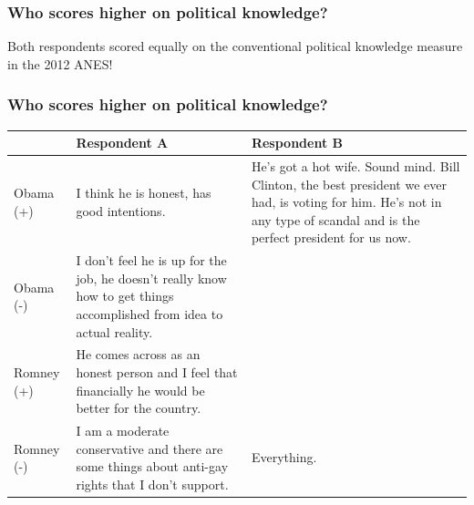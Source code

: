 \documentclass{beamer}
\begin{document}
\begin{frame}%
\frametitle{Who scores higher on political knowledge?}
\begin{center}
\large{Both respondents scored equally on the conventional political knowledge measure in the 2012 ANES!}
\end{center}
\end{frame}


\begin{frame}%
\frametitle{Who scores higher on political knowledge?}
\begin{table}[ht]\footnotesize\centering
\begin{tabular}{l|p{4.5cm}|p{4.5cm}}
   \toprule
    & \textbf{Respondent A} & \textbf{Respondent B} \\ 
    \midrule
  Obama (+) & I think he is honest, has good intentions. & He's got a hot wife. Sound mind. Bill Clinton, the best president we ever had, is voting for him. He's not in any type of scandal and is the perfect president for us now. \\ \hdashline
  Obama (-) & I don't feel he is up for the job, he doesn't really know how to get things accomplished from idea to actual reality. &  \\ \hdashline
  Romney (+) & He comes across as an honest person and I feel that financially he would be better for the country. &  \\ \hdashline
  Romney (-) & I am a moderate conservative and there are some things about anti-gay rights that I don't support. & Everything. \\
    \bottomrule
 \end{tabular}
\end{table}
\end{frame}
\end{document}
